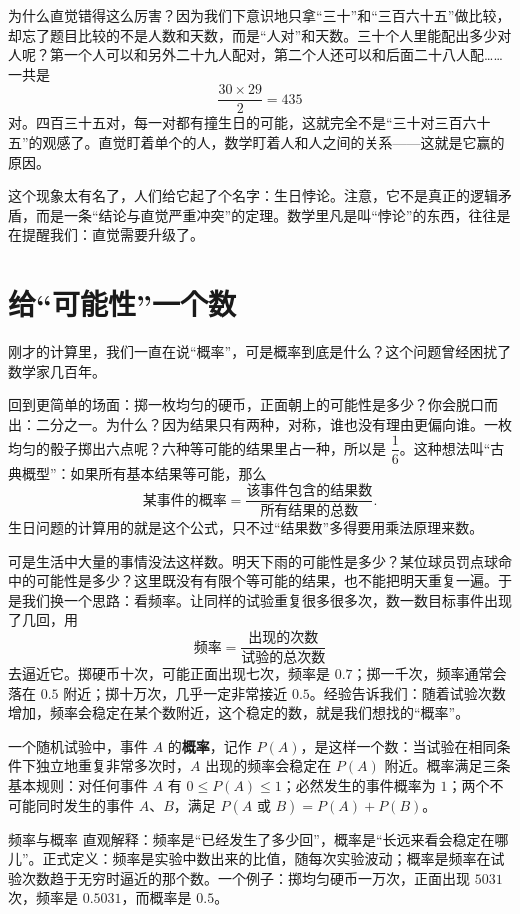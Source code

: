 为什么直觉错得这么厉害？因为我们下意识地只拿“三十”和“三百六十五”做比较，却忘了题目比较的不是人数和天数，而是“人对”和天数。三十个人里能配出多少对人呢？第一个人可以和另外二十九人配对，第二个人还可以和后面二十八人配……一共是
\[
\frac{30\times 29}{2}=435
\]
对。四百三十五对，每一对都有撞生日的可能，这就完全不是“三十对三百六十五”的观感了。直觉盯着单个的人，数学盯着人和人之间的关系——这就是它赢的原因。

这个现象太有名了，人们给它起了个名字：生日悖论。注意，它不是真正的逻辑矛盾，而是一条“结论与直觉严重冲突”的定理。数学里凡是叫“悖论”的东西，往往是在提醒我们：直觉需要升级了。

\section{给“可能性”一个数}

刚才的计算里，我们一直在说“概率”，可是概率到底是什么？这个问题曾经困扰了数学家几百年。

回到更简单的场面：掷一枚均匀的硬币，正面朝上的可能性是多少？你会脱口而出：二分之一。为什么？因为结果只有两种，对称，谁也没有理由更偏向谁。一枚均匀的骰子掷出六点呢？六种等可能的结果里占一种，所以是 $\dfrac{1}{6}$。这种想法叫“古典概型”：如果所有基本结果等可能，那么
\[
\text{某事件的概率}=\frac{\text{该事件包含的结果数}}{\text{所有结果的总数}}.
\]
生日问题的计算用的就是这个公式，只不过“结果数”多得要用乘法原理来数。

可是生活中大量的事情没法这样数。明天下雨的可能性是多少？某位球员罚点球命中的可能性是多少？这里既没有有限个等可能的结果，也不能把明天重复一遍。于是我们换一个思路：看频率。让同样的试验重复很多很多次，数一数目标事件出现了几回，用
\[
\text{频率}=\frac{\text{出现的次数}}{\text{试验的总次数}}
\]
去逼近它。掷硬币十次，可能正面出现七次，频率是 $0.7$；掷一千次，频率通常会落在 $0.5$ 附近；掷十万次，几乎一定非常接近 $0.5$。经验告诉我们：随着试验次数增加，频率会稳定在某个数附近，这个稳定的数，就是我们想找的“概率”。

\begin{dingyi}
一个随机试验中，事件 $A$ 的\textbf{概率}，记作 $P(A)$，是这样一个数：当试验在相同条件下独立地重复非常多次时，$A$ 出现的频率会稳定在 $P(A)$ 附近。概率满足三条基本规则：对任何事件 $A$ 有 $0\le P(A)\le 1$；必然发生的事件概率为 $1$；两个不可能同时发生的事件 $A$、$B$，满足 $P(A\text{ 或 }B)=P(A)+P(B)$。
\end{dingyi}

\begin{shuyu}{频率与概率}
直观解释：频率是“已经发生了多少回”，概率是“长远来看会稳定在哪儿”。正式定义：频率是实验中数出来的比值，随每次实验波动；概率是频率在试验次数趋于无穷时逼近的那个数。一个例子：掷均匀硬币一万次，正面出现 $5031$ 次，频率是 $0.5031$，而概率是 $0.5$。
\end{shuyu}

